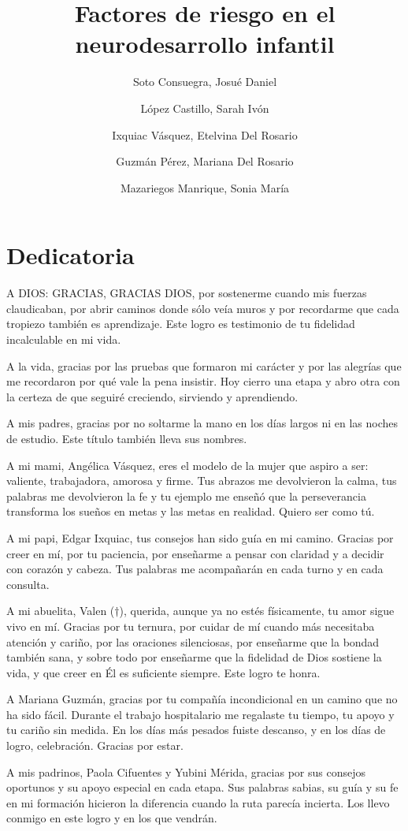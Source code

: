\documentclass[11pt,letterpaper]{report}
\title{Factores de riesgo en el neurodesarrollo infantil}
\author{Soto Consuegra, Josué Daniel \and López Castillo, Sarah Ivón \and
Ixquiac Vásquez, Etelvina Del Rosario \and Guzmán Pérez, Mariana Del Rosario
\and Mazariegos Manrique, Sonia María}
\begin{document}
\chapter*{Dedicatoria}
A DIOS: GRACIAS, GRACIAS DIOS, por sostenerme cuando mis fuerzas claudicaban, 
por abrir caminos donde sólo veía muros y por recordarme que cada tropiezo 
también es aprendizaje. Este logro es testimonio de tu fidelidad incalculable 
en mi vida.

A la vida, gracias por las pruebas que formaron mi carácter y por las alegrías 
que me recordaron por qué vale la pena insistir. Hoy cierro una etapa y abro 
otra con la certeza de que seguiré creciendo, sirviendo y aprendiendo.

A mis padres, gracias por no soltarme la mano en los días largos ni en las 
noches de estudio. Este título también lleva sus nombres.

A mi mami, Angélica Vásquez, eres el modelo de la mujer que aspiro a ser:
valiente, trabajadora, amorosa y firme. Tus abrazos me devolvieron la 
calma, tus palabras me devolvieron la fe y tu ejemplo me enseñó que la 
perseverancia transforma los sueños en metas y las metas en realidad. Quiero 
ser como tú.

A mi papi, Edgar Ixquiac, tus consejos han sido guía en mi camino. 
Gracias por creer en mí, por tu paciencia, por enseñarme a pensar con claridad 
y a decidir con corazón y cabeza. Tus palabras me acompañarán en cada turno y 
en cada consulta.

A mi abuelita, Valen ($\dagger$), querida, aunque ya no estés físicamente, tu
amor sigue vivo en mí. Gracias por tu ternura, por cuidar de mí cuando más
necesitaba atención y cariño, por las oraciones silenciosas, por enseñarme que
la bondad también sana, y sobre todo por enseñarme que la fidelidad de Dios
sostiene la vida, y que creer en Él es suficiente siempre. Este logro te honra.

A Mariana Guzmán, gracias por tu compañía incondicional en un camino 
que no ha sido fácil. Durante el trabajo hospitalario me regalaste tu tiempo, 
tu apoyo y tu cariño sin medida. En los días más pesados fuiste descanso, y 
en los días de logro, celebración. Gracias por estar.

A mis padrinos, Paola Cifuentes y Yubini Mérida, gracias por sus consejos 
oportunos y su apoyo especial en cada etapa. Sus palabras sabias, su guía y 
su fe en mi formación hicieron la diferencia cuando la ruta parecía incierta. 
Los llevo conmigo en este logro y en los que vendrán.
\end{document}
